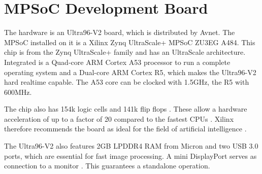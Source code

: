 \section{MPSoC Development Board}
\label{sec:board}

The hardware is an Ultra96-V2 board, which is distributed by Avnet.
The MPSoC installed on it is a Xilinx Zynq UltraScale+ MPSoC ZU3EG A484.
This chip is from the Zynq UltraScale+ family and has an UltraScale architecture.
Integrated is a Quad-core ARM Cortex A53 processor to run a complete operating system and a Dual-core ARM Cortex R5, which makes the Ultra96-V2 hard realtime capable.
The A53 core can be clocked with 1.5GHz, the R5 with 600MHz.

The chip also has 154k logic cells and 141k flip flops \cite{XilinxZynq}.
These allow a hardware acceleration of up to a factor of 20 compared to the fastest CPUs \cite{AccelerationXilinx}.
Xilinx therefore recommends the board as ideal for the field of artificial intelligence \cite{AIResourcesXilinx}.

The Ultra96-V2 also features 2GB LPDDR4 RAM from Micron and two USB 3.0 ports, which are essential for fast image processing.
A mini DisplayPort serves as connection to a monitor \cite{AvnetUltra96v2}. This guarantees a standalone operation.

